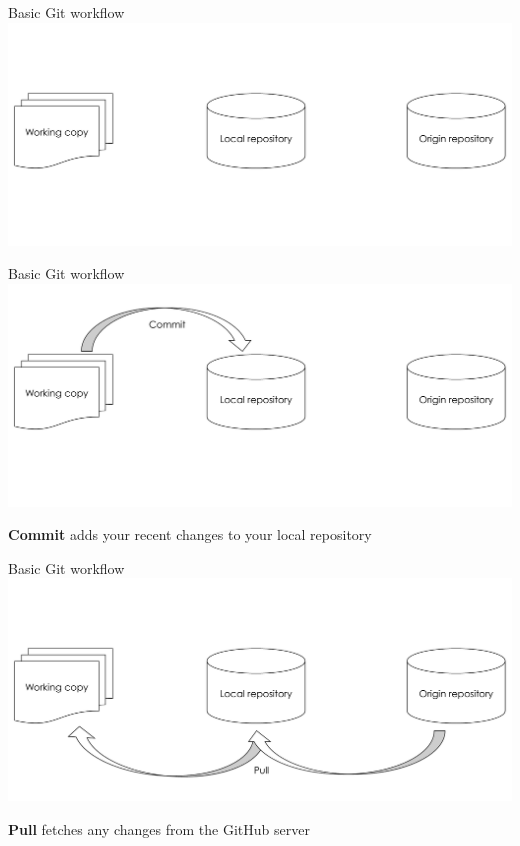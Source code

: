 \begin{frame}{Basic Git workflow}
    \includegraphics[width=\textwidth]{github_workflow_1}
\end{frame}

\begin{frame}{Basic Git workflow}
    \includegraphics[width=\textwidth]{github_workflow_2}
    
    \textbf{Commit} adds your recent changes to your local repository
\end{frame}

\begin{frame}{Basic Git workflow}
    \includegraphics[width=\textwidth]{github_workflow_3}
    
    \textbf{Pull} fetches any changes from the GitHub server
\end{frame}

